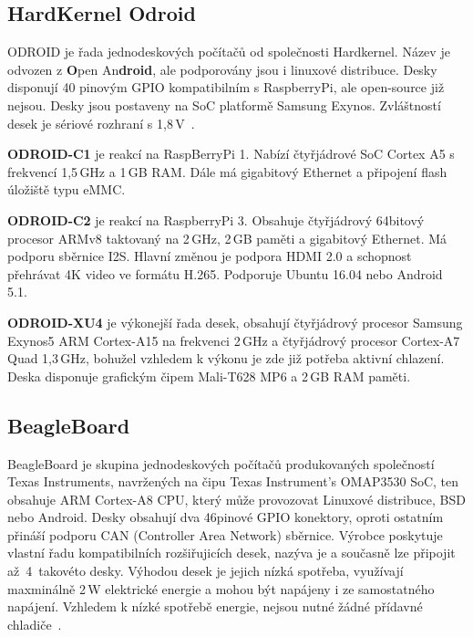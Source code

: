 \subsection{HardKernel Odroid}
	\label{KapKernel}
ODROID je řada jednodeskových počítačů od společnosti Hardkernel. Název je odvozen z \textbf{O}pen An\textbf{droid}, ale podporovány jsou i linuxové distribuce. Desky disponují 40 pinovým GPIO kompatibilním s RaspberryPi, ale open-source již nejsou. Desky jsou postaveny na SoC platformě Samsung Exynos. Zvláštností desek je sériové rozhraní s 1,8\,V~\cite{HardKernel}.
	
	\textbf{ODROID-C1} je reakcí na RaspBerryPi 1. Nabízí čtyřjádrové SoC Cortex A5 s frekvencí 1,5\,GHz a 1\,GB RAM. Dále má gigabitový Ethernet a připojení flash úložiště typu eMMC. 

	\textbf{ODROID-C2} je reakcí na RaspberryPi 3. Obsahuje čtyřjádrový 64bitový procesor ARMv8 taktovaný na 2\,GHz, 2\,GB paměti a gigabitový Ethernet. Má podporu sběrnice I2S. Hlavní změnou je podpora HDMI 2.0 a schopnost přehrávat 4K video ve formátu H.265. Podporuje Ubuntu 16.04 nebo Android 5.1. 
	
	\textbf{ODROID-XU4} je výkonejší řada desek, obsahují čtyřjádrový procesor Samsung Exynos5 ARM Cortex-A15 na frekvenci 2\,GHz a čtyřjádrový procesor Cortex-A7 Quad 1,3\,GHz, bohužel vzhledem k výkonu je zde již potřeba aktivní chlazení. Deska disponuje grafickým čipem Mali-T628 MP6 a 2\,GB RAM paměti.

	
\subsection{BeagleBoard }
BeagleBoard je skupina jednodeskových počítačů produkovaných společností Texas Instruments, navržených na čipu Texas Instrument's OMAP3530 SoC, ten obsahuje ARM Cortex-A8 CPU, který může provozovat Linuxové distribuce, BSD nebo Android. Desky obsahují dva 46pinové GPIO konektory, oproti ostatním přináší podporu CAN (Controller Area Network) sběrnice. Výrobce poskytuje vlastní řadu kompatibilních rozšiřujicích desek, nazýva je  a současně lze připojit až~4~takovéto desky. Výhodou desek je jejich nízká spotřeba, využívají maxminálně 2\,W elektrické energie a mohou být napájeny i ze samostatného napájení. Vzhledem k nízké spotřebě energie, nejsou nutné žádné přídavné chladiče~\cite{BeagleBone}.

